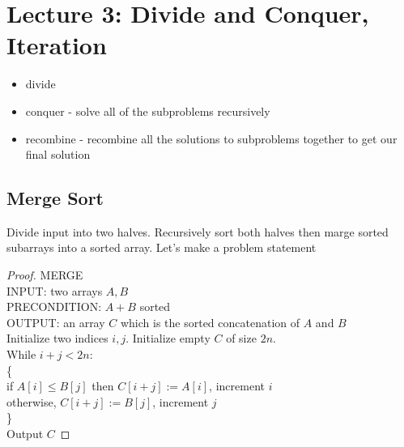 \documentclass[11pt]{article}
\begin{document}
\section{Lecture 3: Divide and Conquer, Iteration}
\begin{itemize}
    \item divide
    \item conquer - solve all of the subproblems recursively
    \item recombine - recombine all the solutions to subproblems together to get our final solution
\end{itemize}
\subsection{Merge Sort}
Divide input into two halves. Recursively sort both halves then marge sorted subarrays into a sorted array. Let's make a problem statement
\begin{proof}
    MERGE \\
    INPUT: two arrays $A,B$ \\
    PRECONDITION: $A+B$ sorted \\
    OUTPUT: an array $C$ which is the sorted concatenation of $A$ and $B$ \\
    Initialize two indices $i,j$. Initialize empty $C$ of size $2n$. \\
    While $i+j < 2n$: \\
    \{ \\
        if $A[i] \leq B[j]$ then $C[i+j] := A[i]$, increment $i$ \\
        otherwise, $C[i+j]:=B[j]$, increment $j$ \\
    \} \\
    Output $C$
\end{proof}
\end{document}
